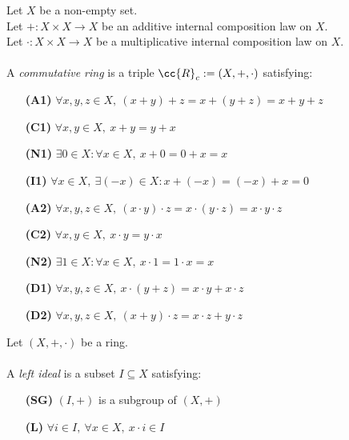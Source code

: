 \begin{definition-pre}
    \label{def:commutative_ring}
    Let $X$ be a non-empty set. \\
    Let $+: X\times X \to X$ be an additive internal composition law on $X$. \\
    Let $\cdot: X\times X \to X$ be a multiplicative internal composition law on $X$. \\\\
    A \textit{commutative ring} is a triple $\cc{R}_c:= (X, +, \cdot)$ satisfying:
    \begin{enumerate}
        \item [\textbf{(A1)}] $\forall x,y,z\in X,\ (x+y)+z= x+(y+z) = x+y+z$
        \item [\textbf{(C1)}] $\forall x,y\in X,\ x+y = y+x$
        \item [\textbf{(N1)}] $\exists 0 \in X : \forall x \in X,\ x+0 = 0+x = x$
        \item [\textbf{(I1)}] $\forall x \in X,\ \exists (-x)\in X: x+(-x) = (-x)+x = 0$
        \item [\textbf{(A2)}] $\forall x,y,z\in X,\ (x\cdot y)\cdot z= x\cdot(y\cdot z) = x\cdot y\cdot z$
        \item [\textbf{(C2)}] $\forall x,y\in X,\ x\cdot y = y\cdot x$
        \item [\textbf{(N2)}] $\exists 1 \in X : \forall x \in X,\ x\cdot1 = 1\cdot x = x$
        \item [\textbf{(D1)}] $\forall x,y,z \in X,\ x\cdot(y+z)=x\cdot y+x\cdot z$
        \item [\textbf{(D2)}] $\forall x,y,z \in X,\ (x+y)\cdot z=x\cdot z+y\cdot z$
    \end{enumerate}
\end{definition-pre}

\begin{definition-pre}
    \label{def:left_ideal}
    Let $(X, +, \cdot)$ be a ring. \\\\
    A \textit{left ideal} is a subset $I \subseteq X$ satisfying:
    \begin{enumerate}
        \item [\textbf{(SG)}] $(I, +)$ is a subgroup of $(X, +)$
        \item [\textbf{(L)}] $\forall i\in I,\ \forall x\in X,\ x\cdot i\in I$
    \end{enumerate}
\end{definition-pre}

